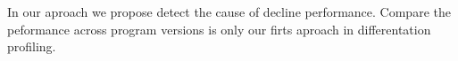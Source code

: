 \documentclass{sig-alternate}
\newcommand{\ab}[1]{\nb{Alexandre}{blue}{#1}}
\begin{document}
In our aproach we propose detect the cause of decline performance. Compare the peformance across program versions is only our firts aproach in differentation profiling.








\end{document}
